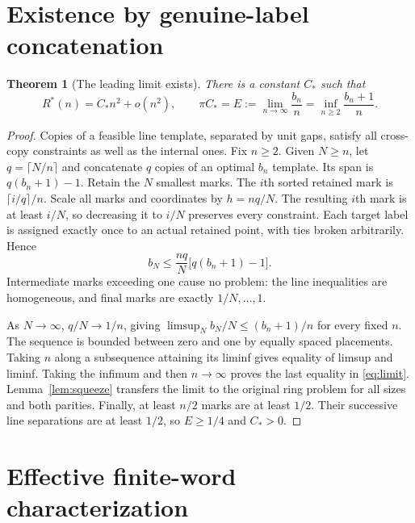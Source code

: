 \documentclass[11pt]{article}
\newtheorem{theorem}{Theorem}
\theoremstyle{definition}\newtheorem{definition}[theorem]{Definition}
\theoremstyle{remark}\newtheorem{remark}[theorem]{Remark}
\newcommand{\Rstar}{R^\ast}
\newcommand{\CC}{C_\ast}
\begin{document}
\section{Existence by genuine-label concatenation}

\begin{theorem}[The leading limit exists]\label{thm:existence}
There is a constant $\CC$ such that
\begin{equation}\label{eq:limit}
 \Rstar(n)=\CC n^2+o(n^2),\qquad
 \pi\CC=E:=\lim_{n\to\infty}\frac{b_n}{n}
 =\inf_{n\ge2}\frac{b_n+1}{n}.
\end{equation}
\end{theorem}
\begin{proof}
Copies of a feasible line template, separated by unit gaps, satisfy all
cross-copy constraints as well as the internal ones. Fix $n\ge2$. Given
$N\ge n$, let $q=\lceil N/n\rceil$ and concatenate $q$ copies of an
optimal $b_n$ template. Its span is $q(b_n+1)-1$.
Retain the $N$ smallest marks. The $i$th sorted retained mark is
$\lceil i/q\rceil/n$. Scale all marks and coordinates by $h=nq/N$.
The resulting $i$th mark is at least $i/N$, so decreasing it to $i/N$
preserves every constraint. Each target label is assigned exactly once
to an actual retained point, with ties broken arbitrarily. Hence
\begin{equation}\label{eq:copies}
 b_N\le\frac{nq}{N}\bigl[q(b_n+1)-1\bigr].
\end{equation}
Intermediate marks exceeding one cause no problem: the line inequalities
are homogeneous, and final marks are exactly $1/N,\ldots,1$.

As $N\to\infty$, $q/N\to1/n$, giving
$\limsup_N b_N/N\le(b_n+1)/n$ for every fixed $n$.
The sequence is bounded between zero and one by equally spaced placements.
Taking $n$ along a subsequence attaining its liminf gives equality of
limsup and liminf. Taking the infimum and then $n\to\infty$ proves
the last equality in \eqref{eq:limit}. Lemma~\ref{lem:squeeze} transfers
the limit to the original ring problem for all sizes and both parities.
Finally, at least $n/2$ marks are at least $1/2$. Their successive line
separations are at least $1/2$, so $E\ge1/4$ and $\CC>0$.
\end{proof}

\section{Effective finite-word characterization}\label{sec:lp}
\end{document}
